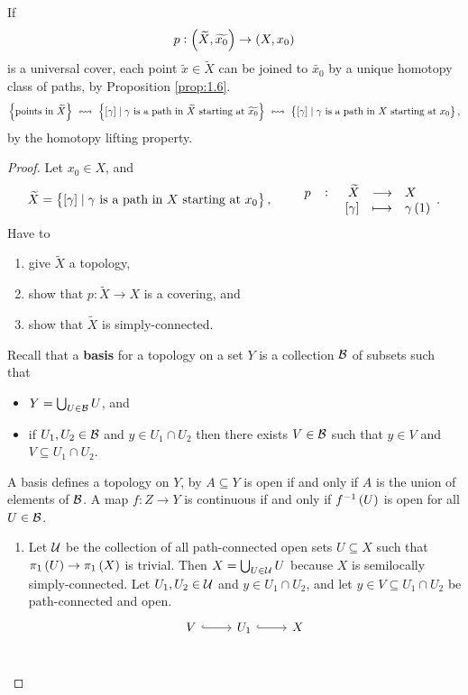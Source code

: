 \begin{remark*}
If
$$ p : \br{\widetilde{X}, \widetilde{x_0}} \to \br{X, x_0} $$
is a universal cover, each point $ \widetilde{x} \in \widetilde{X} $ can be joined to $ \widetilde{x_0} $ by a unique homotopy class of paths, by Proposition \ref{prop:1.6}.
$$ \cbr{\text{points in} \ \widetilde{X}} \ \leftrightsquigarrow \ \cbr{\sbr{\gamma} \mid \gamma \ \text{is a path in} \ \widetilde{X} \ \text{starting at} \ \widetilde{x_0}} \ \leftrightsquigarrow \ \cbr{\sbr{\gamma} \mid \gamma \ \text{is a path in} \ X \ \text{starting at} \ x_0}, $$
by the homotopy lifting property.
\end{remark*}

\begin{proof}
Let $ x_0 \in X $, and
$$ \widetilde{X} = \cbr{\sbr{\gamma} \mid \gamma \ \text{is a path in} \ X \ \text{starting at} \ x_0}, \qquad \function[p]{\widetilde{X}}{X}{\sbr{\gamma}}{\gamma\br{1}}. $$
Have to
\begin{enumerate}
\item give $ \widetilde{X} $ a topology,
\item show that $ p : \widetilde{X} \to X $ is a covering, and
\item show that $ \widetilde{X} $ is simply-connected.
\end{enumerate}
Recall that a \textbf{basis} for a topology on a set $ Y $ is a collection $ \BB $ of subsets such that
\begin{itemize}
\item $ Y = \bigcup_{U \in \BB} U $, and
\item if $ U_1, U_2 \in \BB $ and $ y \in U_1 \cap U_2 $ then there exists $ V \in \BB $ such that $ y \in V $ and $ V \subseteq U_1 \cap U_2 $.
\end{itemize}
A basis defines a topology on $ Y $, by $ A \subseteq Y $ is open if and only if $ A $ is the union of elements of $ \BB $. A map $ f : Z \to Y $ is continuous if and only if $ f^{-1}\br{U} $ is open for all $ U \in \BB $.
\begin{enumerate}
\item Let $ \UU $ be the collection of all path-connected open sets $ U \subseteq X $ such that $ \pi_1\br{U} \to \pi_1\br{X} $ is trivial. Then $ X = \bigcup_{U \in \UU} U $ because $ X $ is semilocally simply-connected. Let $ U_1, U_2 \in \UU $ and $ y \in U_1 \cap U_2 $, and let $ y \in V \subseteq U_1 \cap U_2 $ be path-connected and open.
$$
\begin{tikzcd}
V \arrow[hookrightarrow]{r} & U_1 \arrow[hookrightarrow]{r} & X \\

\end{tikzcd}$$
\end{enumerate}
\end{proof}
